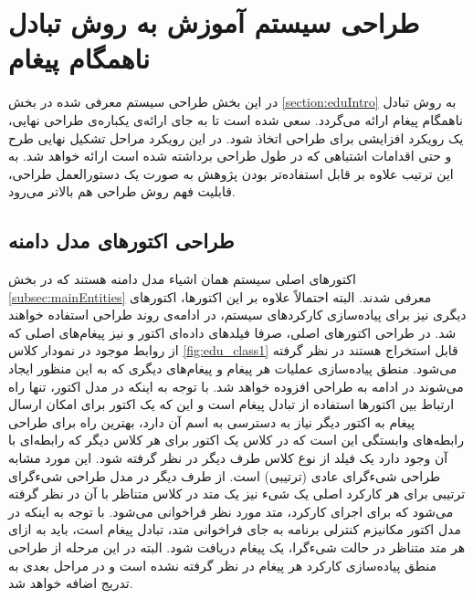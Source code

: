 \newpage
\section{طراحی سیستم آموزش به روش تبادل ناهمگام پیغام}
در این بخش طراحی سیستم معرفی شده در بخش \ref{section:eduIntro} به روش تبادل ناهمگام پیغام ارائه می‌گردد. سعی شده است تا به جای ارائه‌ی یکباره‌ی طراحی نهایی، یک رویکرد \gls{افزایشی} برای طراحی اتخاذ شود. در این رویکرد مراحل تشکیل نهایی طرح و حتی اقدامات اشتباهی که در طول طراحی برداشته شده است ارائه خواهد شد. به  این ترتیب علاوه بر قابل استفاده‌تر بودن پژوهش به صورت یک دستورالعمل  طراحی، قابلیت فهم روش طراحی هم بالاتر می‌رود.
\subsection{طراحی اکتور‌های مدل دامنه}
اکتورهای اصلی سیستم همان اشیاء مدل دامنه هستند که در بخش \ref{subsec:mainEntities} معرفی شدند. البته احتمالاً علاوه بر این اکتورها، اکتورهای دیگری نیز برای پیاده‌سازی کارکردهای سیستم، در ادامه‌ی روند طراحی استفاده خواهند شد. در طراحی اکتورهای اصلی، صرفا فیلد‌های داده‌ای اکتور و نیز پیغام‌های اصلی که از روابط موجود در نمودار کلاس \ref{fig:edu_class1} قابل استخراج هستند در نظر گرفته ‌می‌شود. منطق پیاده‌سازی عملیات هر پیغام و  پیغام‌های دیگری که به این منظور ایجاد می‌شوند در ادامه به طراحی افزوده خواهد شد. 
با توجه به اینکه در مدل اکتور،‌ تنها راه ارتباط بین اکتور‌ها استفاده از تبادل پیغام است و این که یک اکتور برای امکان ارسال پیغام به اکتور دیگر نیاز به دسترسی به اسم آن دارد، بهترین راه برای طراحی رابطه‌های وابستگی این است که در کلاس یک اکتور برای هر کلاس دیگر که رابطه‌ای با آن وجود دارد یک فیلد از نوع کلاس طرف دیگر در نظر گرفته شود. این مورد مشابه طراحی شیءگرای عادی (ترتیبی) است. از طرف دیگر در مدل طراحی شیءگرای ترتیبی برای هر کارکرد اصلی یک شیء نیز یک متد در کلاس متناظر با آن در نظر گرفته می‌شود که برای اجرای کارکرد، متد مورد نظر فراخوانی می‌شود. با توجه به اینکه در مدل اکتور مکانیزم کنترلی برنامه به جای فراخوانی متد، تبادل پیغام است، باید به ازای هر متد متناظر در حالت شیءگرا، یک پیغام دریافت شود. البته در این مرحله از طراحی منطق پیاده‌سازی کارکرد هر پیغام در نظر گرفته نشده است و در مراحل بعدی به تدریج اضافه خواهد شد.
